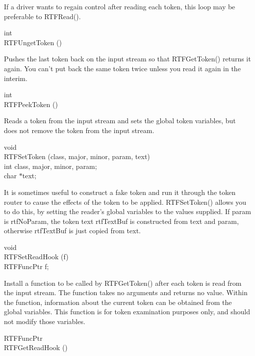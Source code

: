 \documentclass{article}
\begin{document}
\noindent
If a driver wants to regain control after reading each token, this loop may 
be preferable to RTFRead().




\noindent
int\\
RTFUngetToken ()




\noindent
Pushes the last token back on the input stream so that RTFGetToken() returns 
it again. You can't put back the same token twice unless you read it again 
in the interim.




\noindent
int\\
RTFPeekToken ()




\noindent
Reads a token from the input stream and sets the global token variables, 
but does not remove the token from the input stream.




\noindent
void\\
RTFSetToken (class, major, minor, param, text)\\
int	class, major, minor, param;\\
char	$\ast $text;




\noindent
It is sometimes useful to construct a fake token and run it through the token 
router to cause the effects of the token to be applied. RTFSetToken() allows 
you to do this, by setting the reader's global variables to the values supplied. 
If param is rtfNoParam, the token text rtfTextBuf is constructed from text 
and param, otherwise rtfTextBuf is just copied from text.




\noindent
void\\
RTFSetReadHook (f)\\
RTFFuncPtr	f;




\noindent
Install a function to be called by RTFGetToken() after each token is read 
from the input stream. The function takes no arguments and returns no value. 
Within the function, information about the current token can be obtained 
from the global variables. This function is for token examination purposes 
only, and should not modify those variables.




\noindent
RTFFuncPtr\\
RTFGetReadHook ()
\end{document}
